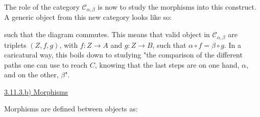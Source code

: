 \documentclass[12pt, letterpaper, twoside]{report}
\begin{document}

The role of the category $\mathcal{C}_{\alpha, \beta}$ is now to study the morphisms into this construct. A generic object from this new category looks like so:


such that the diagram commutes. This means that valid object in $\mathcal{C}_{\alpha, \beta}$ are triplets $(Z, f, g)$, with $f : Z \to A$ and $g : Z \to B$, such that $\alpha \circ f = \beta \circ g$. In a caricatural way, this boils down to studying "the comparison of the different paths one can use to reach $C$, knowing that the last steps are on one hand, $\alpha$, and on the other, $\beta$".

\vspace{5mm}
\underline{3.11.3.b) Morphisms}

Morphisms are defined between objects as:
\end{document}
